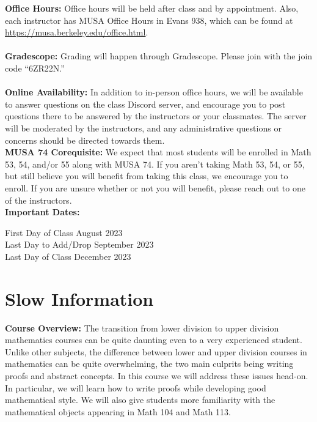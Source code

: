 \documentclass[11pt, a4paper]{article}
\begin{document}
\noindent\textbf{Office Hours:} Office hours will be held after class and by appointment. Also, each instructor has MUSA Office Hours in Evans 938, which can be found at \url{https://musa.berkeley.edu/office.html}.
\\ \\
\noindent\textbf{Gradescope:} Grading will happen through Gradescope. Please join with the join code ``6ZR22N.''
\\ \\
\textbf{Online Availability:} In addition to in-person office hours, we will be available to answer questions on the class Discord server, and encourage you to post questions there to be answered by the instructors or your classmates. The server will be moderated by the instructors, and any administrative questions or concerns should be directed towards them. \\

\noindent\textbf{MUSA 74 Corequisite:} We expect that most students will be enrolled in Math 53, 54, and/or 55 along with MUSA 74. If you aren't taking Math 53, 54, or 55, but still believe you will benefit from taking this class, we encourage you to enroll. If you are unsure whether or not you will benefit, please reach out to one of the instructors. \\

\noindent\textbf{Important Dates:}
\begin{center} \begin{minipage}{3.8in}
\begin{flushleft}
First Day of Class      August 2023  \\
Last Day to Add/Drop      September 2023  \\
Last Day of Class       December 2023  \\
\end{flushleft}
\end{minipage}
\end{center}

\section*{Slow Information}
\noindent\textbf{Course Overview:} 
The transition from lower division to upper division mathematics courses can be quite daunting even to a very experienced student. Unlike other subjects, the difference between lower and upper division courses in mathematics can be quite overwhelming, the two main culprits being writing proofs and abstract concepts. In this course we will address these issues head-on. In particular, we will learn how to write proofs while developing good mathematical style. We will also give students more familiarity with the mathematical objects appearing in Math 104 and Math 113.
\end{document}
